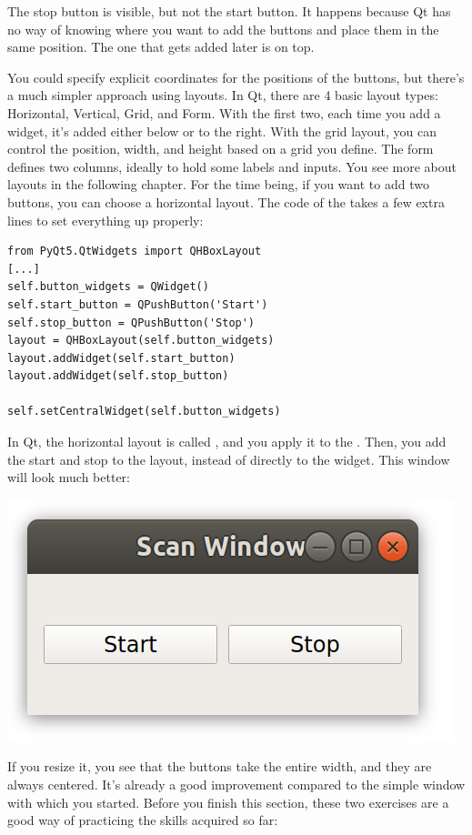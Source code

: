 The stop button is visible, but not the start button. It happens because Qt has no way of knowing where you want to add the buttons and place them in the same position. The one that gets added later is on top.


You could specify explicit coordinates for the positions of the buttons, but there's a much simpler approach using layouts. In Qt, there are 4 basic layout types: Horizontal, Vertical, Grid, and Form. With the first two, each time you add a widget, it's added either below or to the right. With the grid layout, you can control the position, width, and height based on a grid you define. The form defines two columns, ideally to hold some labels and inputs. You see more about layouts in the following chapter. For the time being, if you want to add two buttons, you can choose a horizontal layout. The code of the  takes a few extra lines to set everything up properly:

\begin{verbatim}
from PyQt5.QtWidgets import QHBoxLayout
[...]
self.button_widgets = QWidget()
self.start_button = QPushButton('Start')
self.stop_button = QPushButton('Stop')
layout = QHBoxLayout(self.button_widgets)
layout.addWidget(self.start_button)
layout.addWidget(self.stop_button)

self.setCentralWidget(self.button_widgets)
\end{verbatim}

In Qt, the horizontal layout is called , and you apply it to the . Then, you add the start and stop to the layout, instead of directly to the widget. This window will look much better:

\begin{center}
    \includegraphics[width=.3\textwidth]{images/Chapter_08/06_window_with_layout.png}
\end{center}

If you resize it, you see that the buttons take the entire width, and they are always centered. It's already a good improvement compared to the simple window with which you started. Before you finish this section, these two exercises are a good way of practicing the skills acquired so far:

